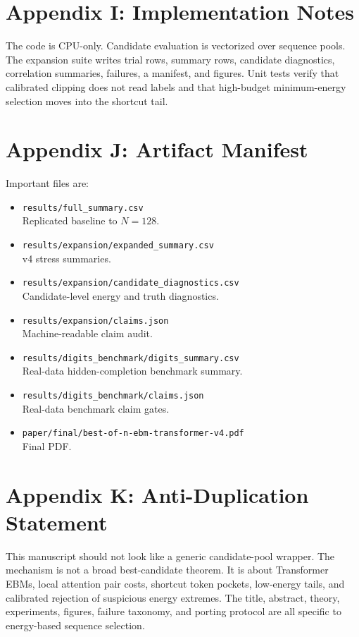 \documentclass{article}
\begin{document}
\section{Appendix I: Implementation Notes}

The code is CPU-only. Candidate evaluation is vectorized over sequence pools.
The expansion suite writes trial rows, summary rows, candidate diagnostics,
correlation summaries, failures, a manifest, and figures. Unit tests verify
that calibrated clipping does not read labels and that high-budget
minimum-energy selection moves into the shortcut tail.

\section{Appendix J: Artifact Manifest}

Important files are:
\begin{itemize}
  \item \texttt{results/full\_summary.csv}\\
  Replicated baseline to $N=128$.
  \item \texttt{results/expansion/expanded\_summary.csv}\\
  v4 stress summaries.
  \item \texttt{results/expansion/candidate\_diagnostics.csv}\\
  Candidate-level energy and truth diagnostics.
  \item \texttt{results/expansion/claims.json}\\
  Machine-readable claim audit.
  \item \texttt{results/digits\_benchmark/digits\_summary.csv}\\
  Real-data hidden-completion benchmark summary.
  \item \texttt{results/digits\_benchmark/claims.json}\\
  Real-data benchmark claim gates.
  \item \texttt{paper/final/best-of-n-ebm-transformer-v4.pdf}\\
  Final PDF.
\end{itemize}

\section{Appendix K: Anti-Duplication Statement}

This manuscript should not look like a generic candidate-pool wrapper. The
mechanism is not a broad best-candidate theorem. It is about Transformer EBMs,
local attention pair costs, shortcut token pockets, low-energy tails, and
calibrated rejection of suspicious energy extremes. The title, abstract,
theory, experiments, figures, failure taxonomy, and porting protocol are all
specific to energy-based sequence selection.
\end{document}
